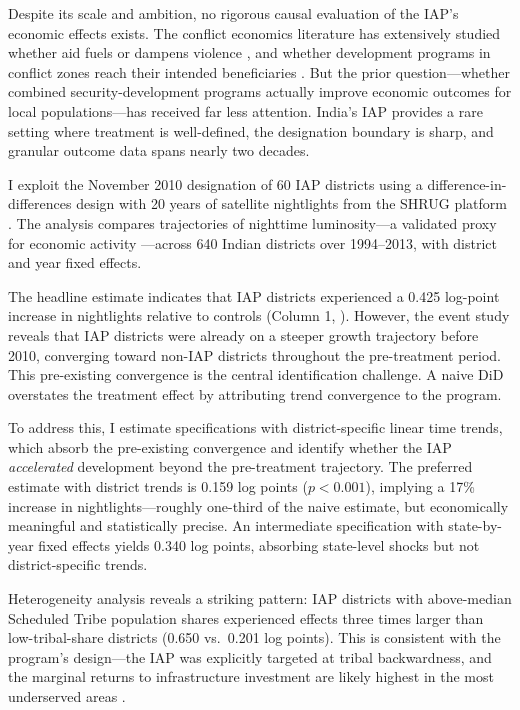 \documentclass[12pt]{article}
\begin{document}
Despite its scale and ambition, no rigorous causal evaluation of the IAP's economic effects exists. The conflict economics literature has extensively studied whether aid fuels or dampens violence \citep{nunn2014, crost2014, dube2016}, and whether development programs in conflict zones reach their intended beneficiaries \citep{fetzer2020}. But the prior question---whether combined security-development programs actually improve economic outcomes for local populations---has received far less attention. India's IAP provides a rare setting where treatment is well-defined, the designation boundary is sharp, and granular outcome data spans nearly two decades.

I exploit the November 2010 designation of 60 IAP districts using a difference-in-differences design with 20 years of satellite nightlights from the SHRUG platform \citep{asher2021}. The analysis compares trajectories of nighttime luminosity---a validated proxy for economic activity \citep{henderson2012, chen2011}---across 640 Indian districts over 1994--2013, with district and year fixed effects.

The headline estimate indicates that IAP districts experienced a 0.425 log-point increase in nightlights relative to controls (Column 1, ). However, the event study reveals that IAP districts were already on a steeper growth trajectory before 2010, converging toward non-IAP districts throughout the pre-treatment period. This pre-existing convergence is the central identification challenge. A naive DiD overstates the treatment effect by attributing trend convergence to the program.

To address this, I estimate specifications with district-specific linear time trends, which absorb the pre-existing convergence and identify whether the IAP \textit{accelerated} development beyond the pre-treatment trajectory. The preferred estimate with district trends is 0.159 log points ($p < 0.001$), implying a 17\% increase in nightlights---roughly one-third of the naive estimate, but economically meaningful and statistically precise. An intermediate specification with state-by-year fixed effects yields 0.340 log points, absorbing state-level shocks but not district-specific trends.

Heterogeneity analysis reveals a striking pattern: IAP districts with above-median Scheduled Tribe population shares experienced effects three times larger than low-tribal-share districts (0.650 vs.\ 0.201 log points). This is consistent with the program's design---the IAP was explicitly targeted at tribal backwardness, and the marginal returns to infrastructure investment are likely highest in the most underserved areas \citep{asher2020, donaldson2018}.
\end{document}
